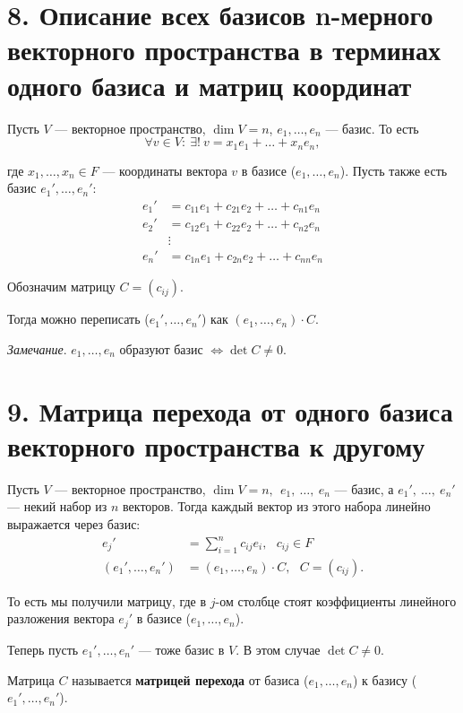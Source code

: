 \documentclass[a4paper, 12pt]{article}
\begin{document}
\section*{8. Описание всех базисов n-мерного векторного пространства в терминах одного базиса и матриц координат}
Пусть $V$ --- векторное пространство, $\dim V = n$, $e_1, \ldots, e_n$ --- базис. То есть 
\[
\forall v \in V:\ \exists!\ v = x_1e_1 + \ldots + x_ne_n,
\]

где $x_1, \ldots, x_n \in F$ --- координаты вектора $v$ в базисе ($e_1, \ldots, e_n$). Пусть также есть базис $e_1', \ldots, e_n'$:
\[\begin{aligned}
e_1' &= c_{11}e_1 + c_{21}e_2 + \ldots + c_{n1}e_n \\
e_2' &= c_{12}e_1 + c_{22}e_2 + \ldots + c_{n2}e_n \\
     &\vdots \\
e_n' &= c_{1n}e_1 + c_{2n}e_2 + \ldots + c_{nn}e_n
\end{aligned}\]

Обозначим матрицу $C = (c_{ij})$.

Тогда можно переписать ($e_1', \ldots, e_n'$) как $(e_1, \ldots, e_n) \cdot C$.

\textit{Замечание}. $e_1, \ldots, e_n$ образуют базис $\Longleftrightarrow \det C \neq 0$.

\section*{9. Матрица перехода от одного базиса векторного пространства к другому}
Пусть $V$ --- векторное пространство, $\dim V = n,\ \ e_1,\ \ldots,\ e_n$ --- базис, а
$e_1',\ \ldots,\ e_n'$ --- некий набор из $n$ векторов. Тогда каждый вектор из этого набора линейно выражается через базис:
\[\begin{aligned}
                e_j' &= \sum_{i=1}^{n}c_{ij}e_i,\ \ \ c_{ij} \in F \\
(e_1', \ldots, e_n') &= (e_1, \ldots, e_n) \cdot C,\ \ \ C = (c_{ij}).
\end{aligned}\]

То есть мы получили матрицу, где в $j$-ом столбце стоят коэффициенты линейного разложения вектора $e_j'$ в базисе ($e_1, \ldots, e_n$).

Теперь пусть $e_1', \ldots, e_n'$ --- тоже базис в $V$. В этом случае $\det C \neq 0$.

Матрица $C$ называется \textbf{матрицей перехода} от базиса ($e_1, \ldots, e_n$) к базису ($e_1', \ldots, e_n'$).
\end{document}
